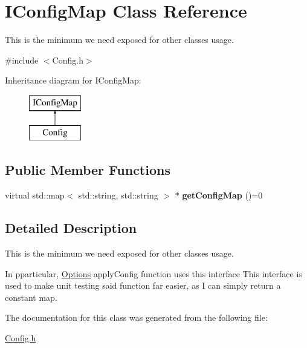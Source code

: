 \hypertarget{classIConfigMap}{}\section{I\+Config\+Map Class Reference}
\label{classIConfigMap}


This is the minimum we need exposed for other classes usage.  




{\ttfamily \#include $<$Config.\+h$>$}

Inheritance diagram for I\+Config\+Map\+:\begin{figure}[H]
\begin{center}
\leavevmode
\includegraphics[height=2.000000cm]{classIConfigMap}
\end{center}
\end{figure}
\subsection*{Public Member Functions}
\begin{DoxyCompactItemize}
\item 
\mbox{\label{classIConfigMap_ad7deec6531121ad6b2a566aa18679f9a}} 
virtual std\+::map$<$ std\+::string, std\+::string $>$ $\ast$ {\bfseries get\+Config\+Map} ()=0
\end{DoxyCompactItemize}


\subsection{Detailed Description}
This is the minimum we need exposed for other classes usage. 

In pparticular, \mbox{\hyperlink{classOptions}{Options}} apply\+Config function uses this interface This interface is used to make unit testing said function far easier, as I can simply return a constant map. 

The documentation for this class was generated from the following file\+:\begin{DoxyCompactItemize}
\item 
\mbox{\hyperlink{Config_8h}{Config.\+h}}\end{DoxyCompactItemize}
